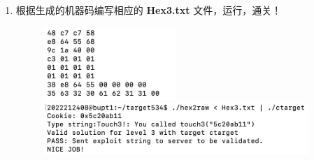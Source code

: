 \begin{enumerate}
\begin{figure}[htbp]
                \end{figure}
            \item 根据生成的机器码编写相应的 \textbf{Hex3.txt} 文件，运行，通关！
                \begin{figure}[htbp]
                    \hspace*{1.5cm}
                    \includegraphics*[width = 5cm]{s3_7.png} \\
                    \hspace*{1.5cm}
                    \includegraphics*[width = 10cm]{s3_8.png}
                \end{figure}
        \end{enumerate}

